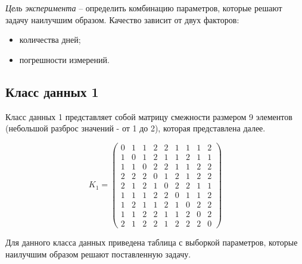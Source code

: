 \textit{Цель эксперимента} -- определить комбинацию параметров, которые решают задачу наилучшим образом. Качество зависит от двух факторов:
\begin{itemize}
    \item количества дней;
    \item погрешности измерений.
\end{itemize}

\subsection{Класс данных 1}

Класс данных 1 представляет собой матрицу смежности размером 9 элементов (небольшой разброс значений - от 1 до 2), которая представлена далее.

\begin{equation}
    \label{eq:kd1}
	K_{1} = \begin{pmatrix}
		0 & 1 & 1 & 2 & 2 & 1 & 1 & 1 & 2 \\ 
        1 & 0 & 1 & 2 & 1 & 1 & 2 & 1 & 1 \\ 
        1 & 1 & 0 & 2 & 2 & 1 & 1 & 2 & 2 \\ 
        2 & 2 & 2 & 0 & 1 & 2 & 1 & 2 & 2 \\ 
        2 & 1 & 2 & 1 & 0 & 2 & 2 & 1 & 1 \\ 
        1 & 1 & 1 & 2 & 2 & 0 & 1 & 1 & 2 \\ 
        1 & 2 & 1 & 1 & 2 & 1 & 0 & 2 & 2 \\ 
        1 & 1 & 2 & 2 & 1 & 1 & 2 & 0 & 2 \\ 
        2 & 1 & 2 & 2 & 1 & 2 & 2 & 2 & 0 
	\end{pmatrix}
\end{equation}

Для данного класса данных приведена таблица с выборкой параметров, которые наилучшим образом решают поставленную задачу.

